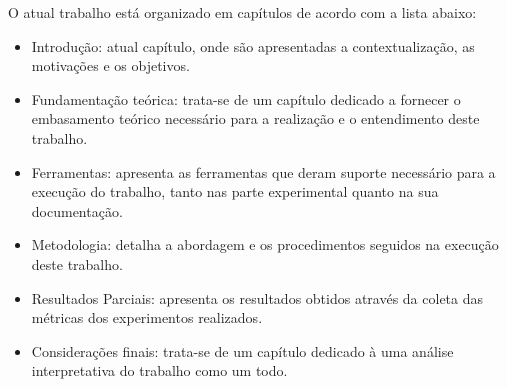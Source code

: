 O atual trabalho está organizado em capítulos de acordo com a lista abaixo:
\begin{itemize}
    \item Introdução: atual capítulo, onde são apresentadas a contextualização, as motivações e os objetivos.
    \item Fundamentação teórica: trata-se de um capítulo dedicado a fornecer o embasamento teórico necessário para a realização e o entendimento deste trabalho.
    \item Ferramentas: apresenta as ferramentas que deram suporte necessário para a execução do trabalho, tanto nas parte experimental quanto na sua documentação.
    \item Metodologia: detalha a abordagem e os procedimentos seguidos na execução deste trabalho.
    \item Resultados Parciais: apresenta os resultados obtidos através da coleta das métricas dos experimentos realizados.
    \item Considerações finais: trata-se de um capítulo dedicado à uma análise interpretativa do trabalho como um todo.
\end{itemize}